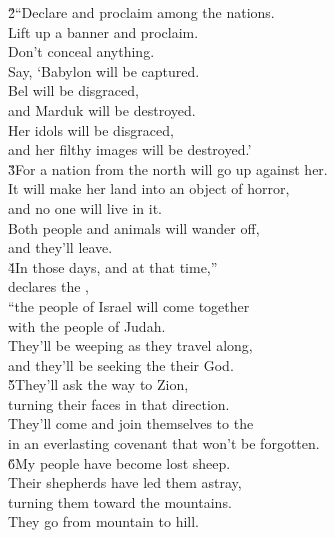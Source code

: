 \begin{poetry}
\poeml \v{2}``Declare and proclaim among the nations. \\
\poemll    Lift up a banner and proclaim. \\
\poeml Don't conceal anything. \\
\poemll    Say, `Babylon will be captured. \\
\poeml Bel will be disgraced, \\
\poemll    and Marduk will be destroyed. \\
\poeml Her idols will be disgraced, \\
\poemll    and her filthy images will be destroyed.' \\
\poeml \v{3}For a nation from the north will go up against her. \\
\poemll    It will make her land into an object of horror, \\
\poemlll       and no one will live in it. \\
\poeml Both people and animals will wander off, \\
\poemll    and they'll leave. \\
\poeml \v{4}In those days, and at that time,'' \\
\poemll    declares the , \\
\poeml ``the people of Israel will come together \\
\poemll    with the people of Judah. \\
\poeml They'll be weeping as they travel along, \\
\poemll    and they'll be seeking the  their God. \\
\poeml \v{5}They'll ask the way to Zion, \\
\poemll    turning their faces in that direction. \\
\poeml They'll come and join themselves to the  \\
\poemll    in an everlasting covenant that won't be forgotten. \\
\poeml \v{6}My people have become lost sheep. \\
\poemll    Their shepherds have led them astray, \\
\poemlll       turning them toward the mountains. \\
\poeml They go from mountain to hill. \\

\end{poetry}
